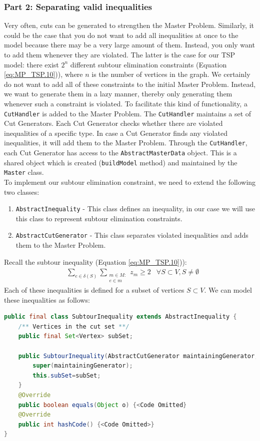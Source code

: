 \documentclass[a4paper]{article}
\newenvironment{myblock}[1]{%
    \tcolorbox[beamer,%
    noparskip,breakable,
    colback=lightBlueCodeBlock,colframe=darkBlueCodeBlock,%
    colbacklower=darkBlueCodeBlock!75!lightBlueCodeBlock,%
    coltitle=blueTitleCodeBlock,
    title=#1]}%
    {\endtcolorbox}
\newcommand{\code}[1]{\lstinline[language=java, style=seminar]!#1!}
\begin{document}
\subsubsection{Part 2: Separating valid inequalities}
Very often, cuts can be generated to strengthen the Master Problem. Similarly, it could be the case that you do not want to add all inequalities at once to the model because there may be a very large amount of them. Instead, you only want to add them whenever they are violated. The latter is the case for our TSP model: there exist $2^n$ different subtour elimination constraints (Equation \ref{eq:MP_TSP.10})), where $n$ is the number of vertices in the graph. We certainly do not want to add all of these constraints to the initial Master Problem. Instead, we want to generate them in a lazy manner, thereby only generating them whenever such a constraint is violated. To facilitate this kind of functionality, a \code{CutHandler} is added to the Master Problem. The \code{CutHandler} maintains a set of Cut Generators. Each Cut Generator checks whether there are violated inequalities of a specific type. In case a Cut Generator finds any violated inequalities, it will add them to the Master Problem. Through the \code{CutHandler}, each Cut Generator has access to the \code{AbstractMasterData} object. This is a shared object which is created (\code{buildModel} method) and maintained by the \code{Master} class.\\
To implement our subtour elimination constraint, we need to extend the following two classes:
\begin{enumerate}[nolistsep]
 \item \code{AbstractInequality} - This class defines an inequality, in our case we will use this class to represent subtour elimination constraints.
 \item \code{AbstractCutGenerator} - This class separates violated inequalities and adds them to the Master Problem.
\end{enumerate}
Recall the subtour inequality (Equation \ref{eq:MP_TSP.10})):
\begin{align}
 &\sum_{e\in \delta(S)}\sum_{\substack{m \in M:\\e\in m}} z_m \geq 2 & \forall S\subset V, S\neq \emptyset
\end{align}
Each of these inequalities is defined for a subset of vertices $S\subset V$. We can model these inequalities as follows:
\begin{myblock}{SubtourInequality}
\begin{lstlisting}[language=java, style=eclipseArticle, xleftmargin=2em]  
public final class SubtourInequality extends AbstractInequality {
	/** Vertices in the cut set **/
	public final Set<Vertex> subSet;
	
	public SubtourInequality(AbstractCutGenerator maintainingGenerator, Set<Vertex> subSet) {
		super(maintainingGenerator);
		this.subSet=subSet;
	}
	@Override
	public boolean equals(Object o) {<Code Omitted}
	@Override
	public int hashCode() {<Code Omitted>}
}
\end{lstlisting}
\end{myblock}
\end{document}
